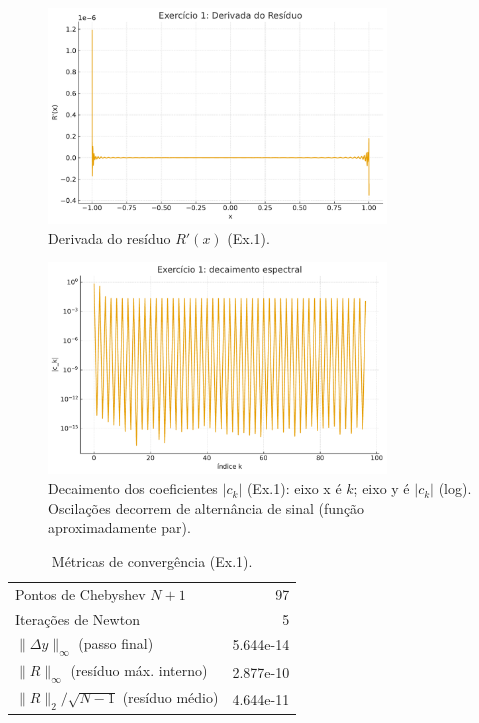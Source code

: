 \documentclass[12pt,a4paper]{article}
\begin{document}
\begin{figure}[H]
  \centering
  \includegraphics[width=0.8\textwidth]{figures/ex1_residual_prime.pdf}
  \caption{Derivada do resíduo \(R'(x)\) (Ex.1).}
  \label{fig:ex1_Rp}
\end{figure}

\begin{figure}[H]
  \centering
  \includegraphics[width=0.8\textwidth]{figures/ex1_coeff_decay.pdf}
  \caption{Decaimento dos coeficientes \(|c_k|\) (Ex.1): eixo x é \(k\); eixo y é \(|c_k|\) (log). Oscilações decorrem de alternância de sinal (função aproximadamente par).}
  \label{fig:ex1_coeff_decay}
\end{figure}

\begin{table}[H]
\centering
\caption{Métricas de convergência (Ex.1).}
\label{tab:ex1_summary}
\begin{tabular}{l r}
\hline
Pontos de Chebyshev \(N{+}1\) & 97 \\
Iterações de Newton & 5 \\
$\|\Delta y\|_{\infty}$ (passo final) & 5.644e-14 \\
$\|R\|_{\infty}$ (resíduo máx. interno) & 2.877e-10 \\
$\|R\|_{2}/\sqrt{N-1}$ (resíduo médio) & 4.644e-11 \\
\hline
\end{tabular}
\end{table}
\end{document}
